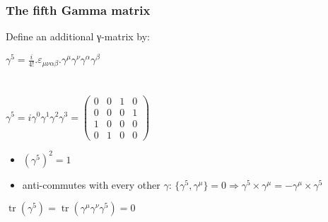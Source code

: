 \label{The fifth Gamma matrix}
\begin{frame}\frametitle{The fifth Gamma matrix}

Define an additional γ-matrix by:\\

\begin{center}
 $\gamma ^{5}={\frac {i}{4!}} . \varepsilon _{\mu \nu \alpha \beta }.\gamma ^{\mu }\gamma ^{\nu }\gamma ^{\alpha }\gamma ^{\beta }$
\\
\\
\\ 
$ \gamma ^{5}=i \gamma^{0} \gamma^{1} \gamma^{2} \gamma^{3} ={\begin{pmatrix}0&0&1&0\\0&0&0&1\\1&0&0&0\\0&1&0&0\end{pmatrix}}$

 
\end{center}


\begin{itemize}
 \item  $(\gamma^5)^2 = 1$
\item anti-commutes with every other $\gamma$:
$\{\gamma^5,\gamma^\mu\}=0 \Longrightarrow \gamma^5\times \gamma^\mu = - \gamma^\mu \times \gamma^5 $
 
\end{itemize}



$\operatorname {tr} \left(\gamma ^{5}\right)=\operatorname {tr} \left(\gamma ^{\mu }\gamma ^{\nu }\gamma ^{5}\right)=0$


\end{frame}



\label{The fifth Gamma matrix}

